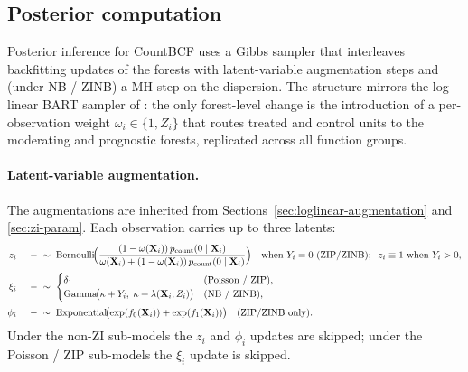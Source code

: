 \documentclass[11pt]{article}
\theoremstyle{plain}
\theoremstyle{definition}
\theoremstyle{remark}
\newcommand{\Ber}{\mathrm{Bernoulli}}
\newcommand{\Ga}{\mathrm{Gamma}}
\newcommand{\Exp}{\mathrm{Exponential}}
\newcommand{\X}{\mathbf{X}}
\newcommand{\fzeroSym}{f_{0}}
\newcommand{\foneSym}{f_{1}}
\newcommand{\zilat}{z_{i}}
\newcommand{\xilat}{\xi_{i}}
\newcommand{\philat}{\phi_{i}}
\newcommand{\omegai}{\omega_{i}}
\begin{document}
\subsection{Posterior computation}\label{sec:posterior}

Posterior inference for CountBCF uses a Gibbs sampler that
interleaves backfitting updates of the forests with latent-variable
augmentation steps and (under NB / ZINB) a MH step on the dispersion.
The structure mirrors the log-linear BART sampler of
\citet[\S 3.3, \S S.3]{murray2021loglinear}: the only forest-level
change is the introduction of a per-observation weight
$\omegai \in \{1, Z_i\}$ that routes treated and control units to the
moderating and prognostic forests, replicated across all function
groups.

\paragraph{Latent-variable augmentation.}
The augmentations are inherited from
Sections~\ref{sec:loglinear-augmentation} and \ref{sec:zi-param}.
Each observation carries up to three latents:
\begin{equation}
  \begin{aligned}
    \zilat \;\mid\; -
      &\;\sim\;
      \Ber\!\Bigl(
        \frac{(1 - \omega(\X_i))\, p_{\mathrm{count}}(0 \mid \X_i)}
             {\omega(\X_i) + (1 - \omega(\X_i))\,
              p_{\mathrm{count}}(0 \mid \X_i)}\Bigr)
        \quad\text{when } Y_i = 0 \text{ (ZIP/ZINB)};
        \;\; \zilat \equiv 1 \text{ when } Y_i > 0, \\[2pt]
    \xilat \;\mid\; -
      &\;\sim\;
      \begin{cases}
        \delta_{1} & \text{(Poisson / ZIP)}, \\
        \Ga\!\bigl(\kappa + Y_i,\;\kappa + \lambda(\X_i, Z_i)\bigr)
        & \text{(NB / ZINB)},
      \end{cases} \\[2pt]
    \philat \;\mid\; -
      &\;\sim\;
      \Exp\!\bigl(\exp(\fzeroSym(\X_i)) + \exp(\foneSym(\X_i))\bigr)
      \quad\text{(ZIP/ZINB only)}.
  \end{aligned}
  \label{eq:three-latents}
\end{equation}
Under the non-ZI sub-models the $\zilat$ and $\philat$ updates are
skipped; under the Poisson / ZIP sub-models the $\xilat$ update is
skipped.
\end{document}
